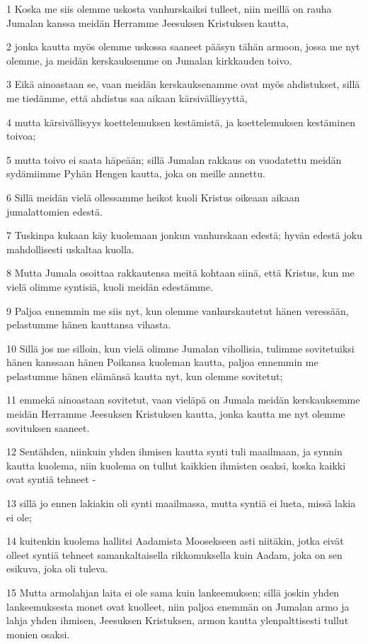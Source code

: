 \par 1 Koska me siis olemme uskosta vanhurskaiksi tulleet, niin meillä on rauha Jumalan kanssa meidän Herramme Jeesuksen Kristuksen kautta,
\par 2 jonka kautta myös olemme uskossa saaneet pääsyn tähän armoon, jossa me nyt olemme, ja meidän kerskauksemme on Jumalan kirkkauden toivo.
\par 3 Eikä ainoastaan se, vaan meidän kerskauksenamme ovat myös ahdistukset, sillä me tiedämme, että ahdistus saa aikaan kärsivällisyyttä,
\par 4 mutta kärsivällisyys koettelemuksen kestämistä, ja koettelemuksen kestäminen toivoa;
\par 5 mutta toivo ei saata häpeään; sillä Jumalan rakkaus on vuodatettu meidän sydämiimme Pyhän Hengen kautta, joka on meille annettu.
\par 6 Sillä meidän vielä ollessamme heikot kuoli Kristus oikeaan aikaan jumalattomien edestä.
\par 7 Tuskinpa kukaan käy kuolemaan jonkun vanhurskaan edestä; hyvän edestä joku mahdollisesti uskaltaa kuolla.
\par 8 Mutta Jumala osoittaa rakkautensa meitä kohtaan siinä, että Kristus, kun me vielä olimme syntisiä, kuoli meidän edestämme.
\par 9 Paljoa ennemmin me siis nyt, kun olemme vanhurskautetut hänen veressään, pelastumme hänen kauttansa vihasta.
\par 10 Sillä jos me silloin, kun vielä olimme Jumalan vihollisia, tulimme sovitetuiksi hänen kanssaan hänen Poikansa kuoleman kautta, paljoa ennemmin me pelastumme hänen elämänsä kautta nyt, kun olemme sovitetut;
\par 11 emmekä ainoastaan sovitetut, vaan vieläpä on Jumala meidän kerskauksemme meidän Herramme Jeesuksen Kristuksen kautta, jonka kautta me nyt olemme sovituksen saaneet.
\par 12 Sentähden, niinkuin yhden ihmisen kautta synti tuli maailmaan, ja synnin kautta kuolema, niin kuolema on tullut kaikkien ihmisten osaksi, koska kaikki ovat syntiä tehneet -
\par 13 sillä jo ennen lakiakin oli synti maailmassa, mutta syntiä ei lueta, missä lakia ei ole;
\par 14 kuitenkin kuolema hallitsi Aadamista Moosekseen asti niitäkin, jotka eivät olleet syntiä tehneet samankaltaisella rikkomuksella kuin Aadam, joka on sen esikuva, joka oli tuleva.
\par 15 Mutta armolahjan laita ei ole sama kuin lankeemuksen; sillä joskin yhden lankeemuksesta monet ovat kuolleet, niin paljoa enemmän on Jumalan armo ja lahja yhden ihmisen, Jeesuksen Kristuksen, armon kautta ylenpalttisesti tullut monien osaksi.
